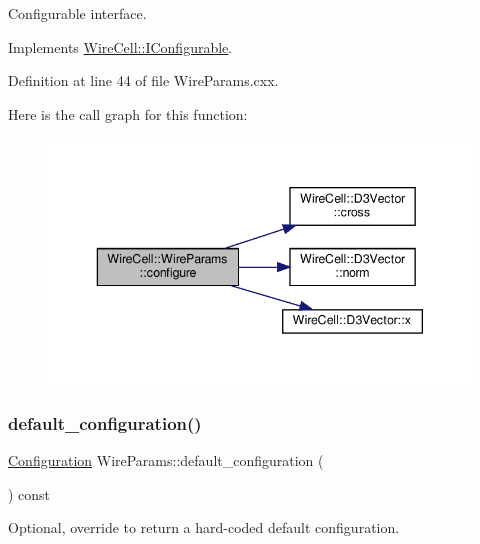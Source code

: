 Configurable interface. 

Implements \hyperlink{class_wire_cell_1_1_i_configurable_a57ff687923a724093df3de59c6ff237d}{Wire\+Cell\+::\+I\+Configurable}.



Definition at line 44 of file Wire\+Params.\+cxx.

Here is the call graph for this function\+:
\nopagebreak
\begin{figure}[H]
\begin{center}
\leavevmode
\includegraphics[width=343pt]{class_wire_cell_1_1_wire_params_a8d20db605558e5fa6afaa7c5cf53ae4f_cgraph}
\end{center}
\end{figure}
\mbox{\label{class_wire_cell_1_1_wire_params_a062a30e00693380e0cf1d74f463b63b9}} 
\subsubsection{\texorpdfstring{default\+\_\+configuration()}{default\_configuration()}}
{\footnotesize\ttfamily \hyperlink{namespace_wire_cell_a9f705541fc1d46c608b3d32c182333ee}{Configuration} Wire\+Params\+::default\+\_\+configuration (\begin{DoxyParamCaption}{ }\end{DoxyParamCaption}) const\hspace{0.3cm}{\ttfamily [virtual]}}



Optional, override to return a hard-\/coded default configuration. 




